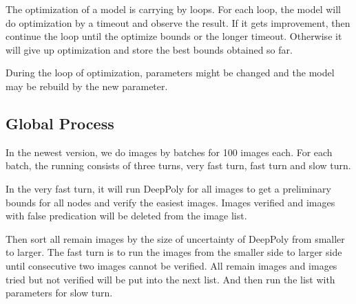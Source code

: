 \documentclass{llncs}
\begin{document}
The optimization of a model is carrying by loops. For each loop, the model will do optimization by a timeout and observe the result. If it gets improvement, then continue the loop until the optimize bounds or the longer timeout. Otherwise it will give up optimization and store the best bounds obtained so far.  

During the loop of optimization, parameters might be changed and the model may be rebuild by the new parameter.


\subsection{Global Process}

In the newest version, we do images by batches for 100 images each. For each batch, the running consists of three turns, very fast turn, fast turn and slow turn.

In the very fast turn, it will run DeepPoly for all images to get a preliminary bounds for all nodes and verify the easiest images. Images verified and images with false predication will be deleted from the image list.

Then sort all remain images by the size of uncertainty of DeepPoly from smaller to larger. The fast turn is to run the images from the smaller side to larger side until consecutive two images cannot be verified. All remain images and images tried but not verified will be put into the next list. And then run the list with parameters for slow turn.

%
%
%
%
\end{document}
